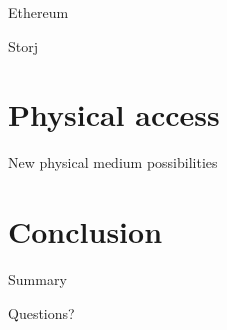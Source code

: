 \documentclass[10pt]{beamer}
\begin{document}
\begin{frame}{Ethereum}
\end{frame}

\begin{frame}{Storj}
\end{frame}


\section{Physical access}

\begin{frame}{New physical medium possibilities}
  
\end{frame}

\section{Conclusion}

\begin{frame}{Summary}
\end{frame}

\begin{frame}[standout]
  Questions?
\end{frame}
\end{document}
